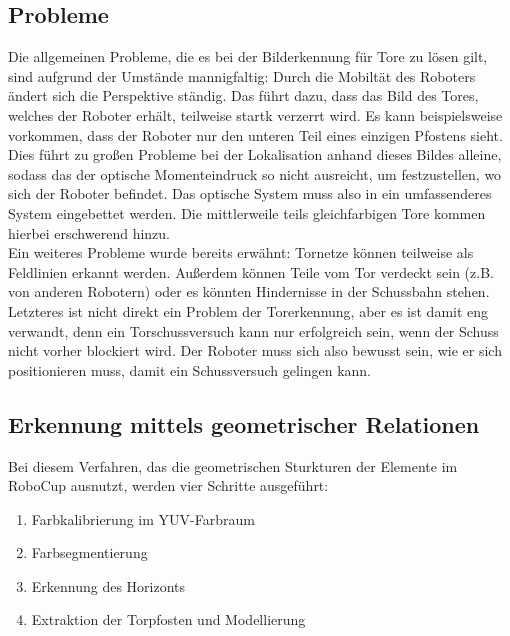 \documentclass[a4paper,12pt]{article}
\begin{document}
\subsection{Probleme}
Die allgemeinen Probleme, die es bei der Bilderkennung für Tore zu lösen gilt, sind aufgrund
der Umstände mannigfaltig: Durch die Mobiltät des Roboters ändert sich die Perspektive ständig. Das
führt dazu, dass das Bild des Tores, welches der Roboter erhält, teilweise startk verzerrt wird. Es
kann beispielsweise vorkommen, dass der Roboter nur den unteren Teil eines einzigen Pfostens sieht.
Dies führt zu großen Probleme bei der Lokalisation anhand dieses Bildes alleine, sodass das der
optische Momenteindruck so nicht ausreicht, um festzustellen, wo sich der Roboter befindet. Das
optische System muss also in ein umfassenderes System eingebettet werden. Die mittlerweile teils
gleichfarbigen Tore kommen hierbei erschwerend hinzu. \\

Ein weiteres Probleme wurde bereits erwähnt: Tornetze können teilweise als Feldlinien erkannt
werden. Außerdem können Teile vom Tor verdeckt sein (z.B. von anderen Robotern) oder es könnten
Hindernisse in der Schussbahn stehen. Letzteres ist nicht direkt ein Problem der Torerkennung, aber
es ist damit eng verwandt, denn ein Torschussversuch kann nur erfolgreich sein, wenn der Schuss
nicht vorher blockiert wird. Der Roboter muss sich also bewusst sein, wie er sich positionieren
muss, damit ein Schussversuch gelingen kann.

\subsection{Erkennung mittels geometrischer Relationen}
Bei diesem Verfahren, das die geometrischen Sturkturen der Elemente im RoboCup ausnutzt, werden
vier Schritte ausgeführt:
\begin{enumerate}
	\item Farbkalibrierung im YUV-Farbraum
	\item Farbsegmentierung
	\item Erkennung des Horizonts
	\item Extraktion der Torpfosten und Modellierung
\end{enumerate}
\end{document}
